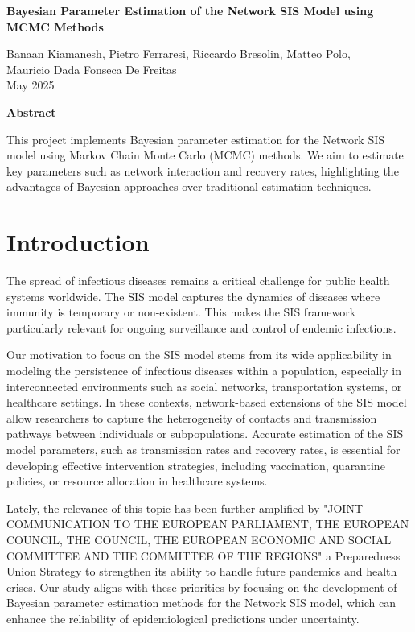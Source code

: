 \documentclass[a4paper,10pt]{report}
\begin{document}
\begin{center}
	{\LARGE\bfseries Bayesian Parameter Estimation of the Network SIS Model using MCMC Methods \par}
	\vspace{0.6cm}
	Banaan Kiamanesh, Pietro Ferraresi, Riccardo Bresolin, Matteo Polo,\\ Mauricio Dada Fonseca De Freitas \\
	May 2025
\end{center}

\vspace{0cm}

\begin{center}
	\textbf{Abstract}
\end{center}
This project implements Bayesian parameter estimation for the Network SIS model using Markov Chain Monte Carlo (MCMC) methods. We aim to estimate key parameters such as network interaction and recovery rates, highlighting the advantages of Bayesian approaches over traditional estimation techniques.


\section{Introduction}

The spread of infectious diseases remains a critical challenge for public health systems worldwide. The SIS model captures the dynamics of diseases where immunity is temporary or non-existent. This makes the SIS framework particularly relevant for ongoing surveillance and control of endemic infections.

Our motivation to focus on the SIS model stems from its wide applicability in modeling the persistence of infectious diseases within a population, especially in interconnected environments such as social networks, transportation systems, or healthcare settings. In these contexts, network-based extensions of the SIS model allow researchers to capture the heterogeneity of contacts and transmission pathways between individuals or subpopulations. Accurate estimation of the SIS model parameters, such as transmission rates and recovery rates, is essential for developing effective intervention strategies, including vaccination, quarantine policies, or resource allocation in healthcare systems.

Lately, the relevance of this topic has been further amplified by "JOINT COMMUNICATION TO THE EUROPEAN PARLIAMENT, THE 
EUROPEAN COUNCIL, THE COUNCIL, THE EUROPEAN ECONOMIC AND 
SOCIAL COMMITTEE AND THE COMMITTEE OF THE REGIONS" a Preparedness Union Strategy to strengthen its ability to handle future pandemics and health crises. Our study aligns with these priorities by focusing on the development of Bayesian parameter estimation methods for the Network SIS model, which can enhance the reliability of epidemiological predictions under uncertainty.
\end{document}
